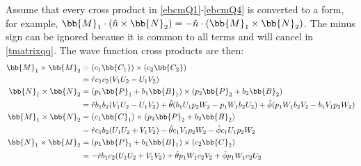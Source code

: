 \begin{itemize}
Assume that every cross product in \eqref{ebcmQ1}-\eqref{ebcmQ4} is converted to a form, for example, $\bb{M}_1 \cdot (\hat{n} \times \bb{N}_2) = - \hat{n} \cdot (\bb{M}_1  \times \bb{N}_2)$. The minus sign can be ignored because it is common to all terms and will cancel in \eqref{tmatrixqq}. The wave function cross products are then:
\begin{align}
\bb{M}_1 \times \bb{M}_2 &= (c_1 \bb{C_1})\times (c_2 \bb{C_2}) \\
\ &= \hat{r} c_1c_2 (V_1U_2- U_1V_2) \label{crossexample} \\
\bb{N}_1 \times \bb{N}_2 &= (p_1\bb{P}_1 + b_1 \bb{B}_1)\times (p_2\bb{P}_2 + b_2 \bb{B}_2) \\
\ &= \hat{r} b_1b_2(V_1U_2 - U_1V_2) + \hat{\theta} (b_1U_1p_2W_2 - p_1W_1b_2U_2)  + \hat{\phi}(p_1W_1b_2V_2 - b_1V_1p_2W_2) \\
\bb{M}_1 \times \bb{N}_2 &= (c_1 \bb{C}_1) \times (p_2 \bb{P}_2 + b_2 \bb{B}_2) \\
\ &= \hat{r} c_1b_2 (U_1 U_2 + V_1 V_2) - \hat{\theta} c_1 V_1 p_2 W_2 - \hat{\phi} c_1U_1 p_2 W_2 \\
\bb{N}_1 \times \bb{M}_2  &=  (p_1 \bb{P}_1 + b_1 \bb{B}_1)\times (c_2 \bb{C}_2)  \\
\ &= -\hat{r} b_1 c_2 (U_1 U_2 + V_1 V_2) + \hat{\theta}p_1 W_1 c_2 V_2 + \hat{\phi} p_1 W_1 c_2U_2  
\end{align}




\end{itemize}
